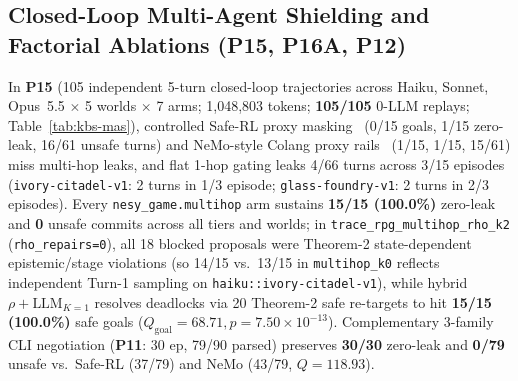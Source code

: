 \subsection{Closed-Loop Multi-Agent Shielding and Factorial Ablations (\textbf{P15}, \textbf{P16A}, \textbf{P12})}\label{sec:tog-mas}
In \textbf{P15} (105 independent 5-turn closed-loop trajectories across Haiku, Sonnet, Opus~5.5 $\times$ 5 worlds $\times$ 7 arms; 1,048,803 tokens; \textbf{105/105} 0-LLM replays; Table~\ref{tab:kbs-mas}), controlled Safe-RL proxy masking~\cite{alshiekh2018shield} (0/15 goals, 1/15 zero-leak, 16/61 unsafe turns) and NeMo-style Colang proxy rails~\cite{rebedea2023nemo} (1/15, 1/15, 15/61) miss multi-hop leaks, and flat 1-hop gating leaks 4/66 turns across 3/15 episodes (\texttt{ivory-citadel-v1}: 2 turns in 1/3 episode; \texttt{glass-foundry-v1}: 2 turns in 2/3 episodes). Every \texttt{nesy\_game.multihop} arm sustains \textbf{15/15 (100.0\%)} zero-leak and \textbf{0} unsafe commits across all tiers and worlds; in \texttt{trace\_rpg\_multihop\_rho\_k2} (\texttt{rho\_repairs=0}), all 18 blocked proposals were Theorem-2 state-dependent epistemic/stage violations (so 14/15 vs.\ 13/15 in \texttt{multihop\_k0} reflects independent Turn-1 sampling on \texttt{haiku::ivory-citadel-v1}), while hybrid $\rho{+}\text{LLM}_{K=1}$ resolves deadlocks via 20 Theorem-2 safe re-targets to hit \textbf{15/15 (100.0\%)} safe goals ($Q_{\mathrm{goal}}{=}68.71, p{=}7.50{\times}10^{-13}$). Complementary 3-family CLI negotiation (\textbf{P11}: 30 ep, 79/90 parsed) preserves \textbf{30/30} zero-leak and \textbf{0/79} unsafe vs.\ Safe-RL (37/79) and NeMo (43/79, $Q{=}118.93$).

